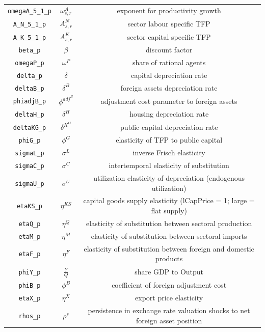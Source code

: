\begin{center}
\begin{longtable}{ccc}
\texttt{omegaA\_5\_1\_p} & ${\omega^{A}_{s,r}}$ & exponent for productivity growth\\
\texttt{A\_N\_5\_1\_p} & ${A^{N}_{s,r}}$ & sector labour specific TFP\\
\texttt{A\_K\_5\_1\_p} & ${A^{K}_{s,r}}$ & sector capital specific TFP\\
\texttt{beta\_p} & ${\beta}$ & discount factor\\
\texttt{omegaP\_p} & ${\omega^{P}}$ & share of rational agents\\
\texttt{delta\_p} & ${\delta}$ & capital depreciation rate\\
\texttt{deltaB\_p} & ${\delta^B}$ & foreign assets depreciation rate\\
\texttt{phiadjB\_p} & ${\phi^{adj^B}}$ & adjustment cost parameter to foreign assets\\
\texttt{deltaH\_p} & ${\delta^H}$ & housing depreciation rate\\
\texttt{deltaKG\_p} & ${\delta^{K^{G}}}$ & public capital depreciation rate\\
\texttt{phiG\_p} & ${\phi^{G}}$ & elasticity of TFP to public capital\\
\texttt{sigmaL\_p} & ${\sigma^{L}}$ & inverse Frisch elasticity\\
\texttt{sigmaC\_p} & ${\sigma^{C}}$ & intertemporal elasticity of substitution\\
\texttt{sigmaU\_p} & ${\sigma^{U}}$ & utilization elasticity of depreciation (endogenous utilization)\\
\texttt{etaKS\_p} & ${\eta^{KS}}$ & capital goods supply elasticity (lCapPrice = 1; large = flat supply)\\
\texttt{etaQ\_p} & ${\eta^{Q}}$ & elasticity of substitution between sectoral production\\
\texttt{etaM\_p} & ${\eta^{M}}$ & elasticity of substitution between sectoral imports\\
\texttt{etaF\_p} & ${\eta^{F}}$ & elasticity of substitution between foreign and domestic products\\
\texttt{phiY\_p} & ${\frac{Y}{Q}}$ & share GDP to Output\\
\texttt{phiB\_p} & ${\phi^{B}}$ & coefficient of foreign adjustment cost\\
\texttt{etaX\_p} & ${\eta^{X}}$ & export price elasticity\\
\texttt{rhos\_p} & ${\rho^{s}}$ & persistence in exchange rate valuation shocks to net foreign asset position\\

\end{longtable}
\end{center}
